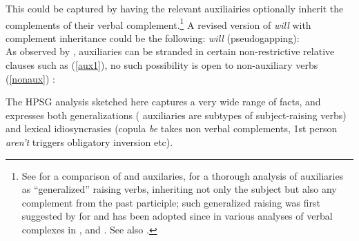 \documentclass[output=paper
	        ,collection
	        ,collectionchapter
 	        ,biblatex
                ,babelshorthands
                ,newtxmath
                ,draftmode
                ,colorlinks, citecolor=brown
]{langscibook}
\begin{document}
This could be captured by having the relevant auxiliairies optionally inherit the complements of their verbal complement.\footnote{See  for a comparison of  and  auxilaries,  for a thorough analysis of  auxiliaries as ``generalized'' raising verbs, inheriting not only the subject but also any complement from the past participle; such generalized raising was first suggested by \citet{HN89a,HN94a} for  and has been adopted since in various analyses of verbal complexes in  \citep{Kiss95a,Meurers2000b,Kathol2001a,Mueller99a,Mueller2002b},  \citep{BvN98a} and  \citep[Section~4]{MuellerPersian}. See also .}
A revised version of \emph{will} with complement inheritance could be the following:
\ea
\emph{will} (pseudogapping):\\
\z
As observed by \citet{ArnoldandBorsley2008}, auxiliaries can be stranded in certain non-restrictive relative clauses such as (\ref{aux1}), no such possibility is open to non-auxiliary verbs (\ref{nonaux}) :

\eal
{}
\zl

The HPSG analysis sketched here captures a very wide range of facts, and expresses both generalizations ( auxiliaries are subtypes of subject-raising verbs) and lexical idiosyncrasies (copula \emph{be} takes non verbal complements, 1st person \emph{aren't} triggers obligatory inversion etc).


	
\end{document}
